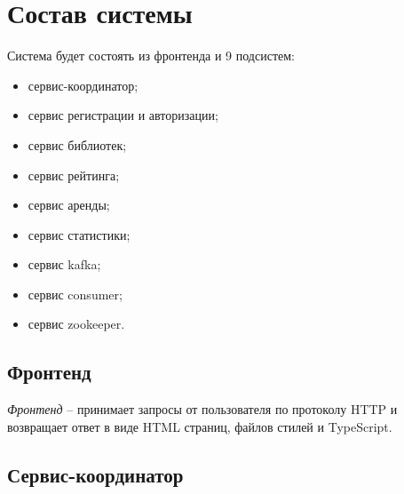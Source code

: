 \section{Состав системы}

Система будет состоять из фронтенда и 9 подсистем:
\begin{itemize}
	\item сервис-координатор;
	\item сервис регистрации и авторизации;
  \item сервис библиотек;
  \item сервис рейтинга;
  \item сервис аренды;
  \item сервис статистики;
  \item сервис kafka;
  \item сервис consumer;
  \item сервис zookeeper.
\end{itemize}


\subsection{Фронтенд}

\textit{Фронтенд} -- принимает запросы от пользователя по протоколу HTTP и возвращает ответ в виде HTML страниц, файлов стилей и TypeScript.


\subsection{Сервис-координатор}

